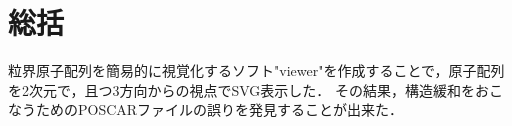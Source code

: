 \section{総括}
粒界原子配列を簡易的に視覚化するソフト"viewer"を作成することで，原子配列を2次元で，且つ3方向からの視点でSVG表示した．
その結果，構造緩和をおこなうためのPOSCARファイルの誤りを発見することが出来た．

